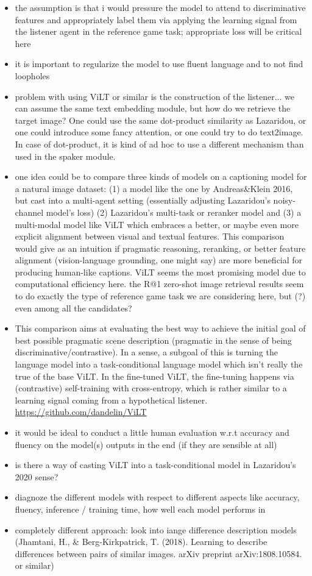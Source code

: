 \documentclass[11pt,letterpaper]{article}
\begin{document}
\begin{itemize}
	\item the assumption is that i would pressure the model to attend to discriminative features and appropriately label them via applying the learning signal from the listener agent in the reference game task; appropriate loss will be critical here
	\item it is important to regularize the model to use fluent language and to not find loopholes
	\item problem with using ViLT or similar is the construction of the listener... we can assume the same text embedding module, but how do we retrieve the target image? One could use the same dot-product similarity as Lazaridou, or one could introduce some fancy attention, or one could try to do text2image. In case of dot-product, it is kind of ad hoc to use a different mechanism than used in the spaker module.
	\item one idea could be to compare three kinds of models on a captioning model for a natural image dataset: (1) a model like the one by Andreas\&Klein 2016, but cast into a multi-agent setting (essentially adjusting Lazaridou's noisy-channel model's loss) (2) Lazaridou's multi-task or reranker model and (3) a multi-modal model like ViLT which embraces a better, or maybe even more explicit alignment between visual and textual features. This comparison would give as an intuition if pragmatic reasoning, reranking, or better feature alignment (vision-language grounding, one might say) are more beneficial for producing human-like captions. ViLT seems the most promising model due to computational efficiency here. the R@1 zero-shot image retrieval results seem to do exactly the type of reference game task we are considering here, but (?) even among all the candidates?
	\item This comparison aims at evaluating the best way to achieve the initial goal of best possible pragmatic scene description (pragmatic in the sense of being  discriminative/contrastive). In a sense, a subgoal of this is turning the language model into a task-conditional language model which isn't really the true of the base ViLT. In the fine-tuned ViLT, the fine-tuning happens via (contrastive) self-training with cross-entropy, which is rather similar to a learning signal coming from a hypothetical listener. \url{https://github.com/dandelin/ViLT}
	\item it would be ideal to conduct a little human evaluation w.r.t accuracy and fluency on the model(s) outputs in the end (if they are sensible at all)
	\item is there a way of casting ViLT into a task-conditional model in Lazaridou's 2020 sense?
	\item diagnoze the different models with respect to different aspects like accuracy, fluency, inference / training time, how well each model performs in 
	\item completely different approach: look into iange difference description models (Jhamtani, H., \& Berg-Kirkpatrick, T. (2018). Learning to describe differences between pairs of similar images. arXiv preprint arXiv:1808.10584. or similar)
\end{itemize}
\newpage

\end{document}
